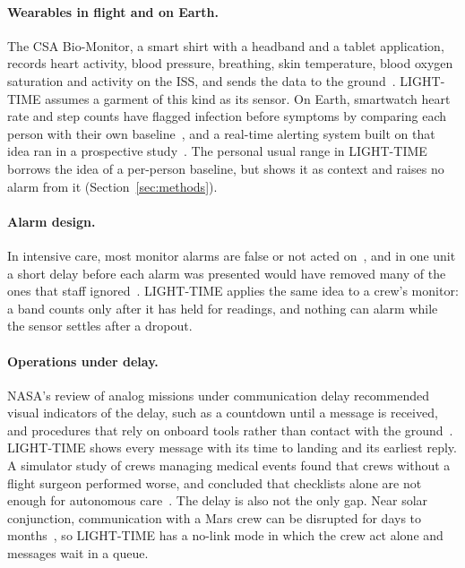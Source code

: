 \paragraph{Wearables in flight and on Earth.}
The CSA Bio-Monitor, a smart shirt with a headband and a tablet application, records heart activity, blood pressure, breathing, skin temperature, blood oxygen saturation and activity on the ISS, and sends the data to the ground~\cite{csaBioMonitor}. LIGHT-TIME assumes a garment of this kind as its sensor. On Earth, smartwatch heart rate and step counts have flagged infection before symptoms by comparing each person with their own baseline~\cite{mishra2020}, and a real-time alerting system built on that idea ran in a prospective study~\cite{alavi2022}. The personal usual range in LIGHT-TIME borrows the idea of a per-person baseline, but shows it as context and raises no alarm from it (Section~\ref{sec:methods}).

\paragraph{Alarm design.}
In intensive care, most monitor alarms are false or not acted on~\cite{drew2014alarm,gorges2009alarm}, and in one unit a short delay before each alarm was presented would have removed many of the ones that staff ignored~\cite{gorges2009alarm}. LIGHT-TIME applies the same idea to a crew's monitor: a band counts only after it has held for \numSustainN{} readings, and nothing can alarm while the sensor settles after a dropout.

\paragraph{Operations under delay.}
NASA's review of analog missions under communication delay recommended visual indicators of the delay, such as a countdown until a message is received, and procedures that rely on onboard tools rather than contact with the ground~\cite{rader2013delay}. LIGHT-TIME shows every message with its time to landing and its earliest reply. A simulator study of crews managing medical events found that crews without a flight surgeon performed worse, and concluded that checklists alone are not enough for autonomous care~\cite{yule2023crew}. The delay is also not the only gap. Near solar conjunction, communication with a Mars crew can be disrupted for days to months~\cite{mcbrayer2022delay}, so LIGHT-TIME has a no-link mode in which the crew act alone and messages wait in a queue.

